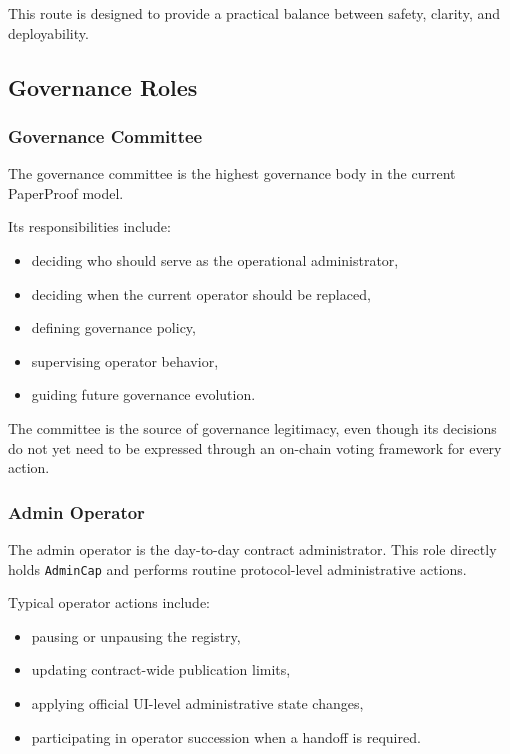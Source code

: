 \documentclass[journal]{IEEEtran}
\begin{document}
This route is designed to provide a practical balance between safety, clarity, and deployability.

\subsection{Governance Roles}

\subsubsection{Governance Committee}

The governance committee is the highest governance body in the current PaperProof model.

Its responsibilities include:
\begin{itemize}
    \item deciding who should serve as the operational administrator,
    \item deciding when the current operator should be replaced,
    \item defining governance policy,
    \item supervising operator behavior,
    \item guiding future governance evolution.
\end{itemize}


The committee is the source of governance legitimacy, even though its decisions do not yet need to be expressed through an on-chain voting framework for every action.

\subsubsection{Admin Operator}

The admin operator is the day-to-day contract administrator. This role directly holds \texttt{AdminCap} and performs routine protocol-level administrative actions.

Typical operator actions include:
\begin{itemize}
    \item pausing or unpausing the registry,
    \item updating contract-wide publication limits,
    \item applying official UI-level administrative state changes,
    \item participating in operator succession when a handoff is required.
\end{itemize}
\end{document}
